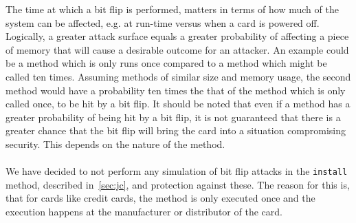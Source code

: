 The time at which a bit flip is performed, matters in terms of how much of the system can be affected, e.g. at run-time versus when a card is powered off. Logically, a greater attack surface equals a greater probability of affecting a piece of memory that will cause a desirable outcome for an attacker. An example could be a method which is only runs once compared to a method which might be called ten times. Assuming methods of similar size and memory usage, the second method would have a probability ten times the that of the method which is only called once, to be hit by a bit flip. It should be noted that even if a method has a greater probability of being hit by a bit flip, it is not guaranteed that there is a greater chance that the bit flip will bring the card into a situation compromising security. This depends on the nature of the method.\\\\
We have decided to not perform any simulation of bit flip attacks in the \texttt{install} method, described in~\cref{sec:jc}, and protection against these. The reason for this is, that for cards like credit cards, the method is only executed once and the execution happens at the manufacturer or distributor of the card.

%
